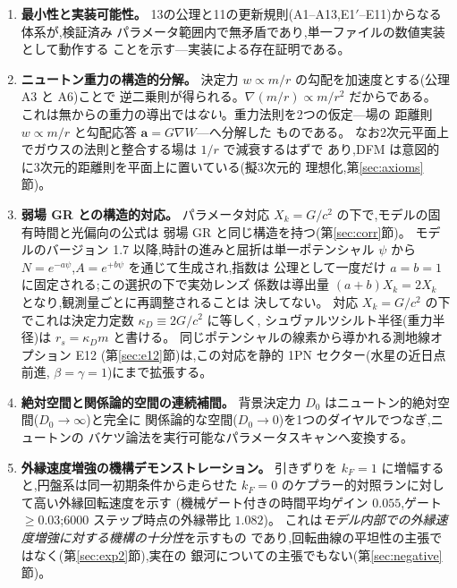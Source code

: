 \documentclass[a4paper,10pt,twocolumn]{ltjsarticle}
\newcommand{\vect}[1]{\bm{#1}}
\newcommand{\Kt}{X_k}
\newcommand{\Dz}{D_0}
\begin{document}
\begin{enumerate}
\item[C1.]{\bf 最小性と実装可能性。}
13の公理と11の更新規則(A1--A13,E1$'$--E11)からなる体系が,検証済み
パラメータ範囲内で無矛盾であり,単一ファイルの数値実装として動作する
ことを示す---実装による存在証明である。

\item[C2.]{\bf ニュートン重力の構造的分解。}
決定力 $w \propto m/r$ の勾配を加速度とする(公理 A3 と A6)ことで
逆二乗則が得られる。$\nabla(m/r) \propto m/r^2$ だからである。
これは無からの重力の導出では\emph{ない}。重力法則を2つの仮定---場の
距離則 $w \propto m/r$ と勾配応答 $\vect{a} = G\nabla W$---へ分解した
ものである。
なお2次元平面上でガウスの法則と整合する場は $1/r$ で減衰するはずで
あり,DFM は意図的に3次元的距離則を平面上に置いている(擬3次元的
理想化,第\ref{sec:axioms}節)。

\item[C3.]{\bf 弱場 GR との構造的対応。}
パラメータ対応 $\Kt = G/c^2$ の下で,モデルの固有時間と光偏向の公式は
弱場 GR と同じ構造を持つ(第\ref{sec:corr}節)。
モデルのバージョン 1.7 以降,時計の進みと屈折は単一ポテンシャル
$\psi$ から $N = e^{-a\psi}$,$A = e^{+b\psi}$ を通じて生成され,指数は
公理として一度だけ $a = b = 1$ に固定される;この選択の下で実効レンズ
係数は導出量 $(a+b)\Kt = 2\Kt$ となり,観測量ごとに再調整されることは
決してない。
対応 $\Kt = G/c^2$ の下でこれは決定力定数 $\kappa_D \equiv 2G/c^2$ に等しく,
シュヴァルツシルト半径(重力半径)は $r_s = \kappa_D m$ と書ける。
同じポテンシャルの線素から導かれる測地線オプション E12
(第\ref{sec:e12}節)は,この対応を静的 1PN セクター(水星の近日点前進,
$\beta = \gamma = 1$)にまで拡張する。

\item[C4.]{\bf 絶対空間と関係論的空間の連続補間。}
背景決定力 $\Dz$ はニュートン的絶対空間($\Dz \to \infty$)と完全に
関係論的な空間($\Dz \to 0$)を1つのダイヤルでつなぎ,ニュートンの
バケツ論法を実行可能なパラメータスキャンへ変換する。

\item[C5.]{\bf 外縁速度増強の機構デモンストレーション。}
引きずりを $k_F = 1$ に増幅すると,円盤系は同一初期条件から走らせた
$k_F = 0$ のケプラー的対照ランに対して高い外縁回転速度を示す
(機械ゲート付きの時間平均ゲイン $0.055$,ゲート $\ge 0.03$;6000
ステップ時点の外縁帯比 $1.082$)。
これは\emph{モデル内部での外縁速度増強に対する機構の十分性}を示すもの
であり,回転曲線の平坦性の主張ではなく(第\ref{sec:exp2}節),実在の
銀河についての主張でもない(第\ref{sec:negative}節)。


\end{enumerate}
\end{document}
